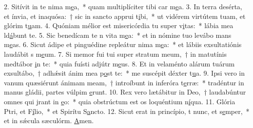 2. Sitívit in te nima m\uline{e}a,~* quam multiplíciter tibi car m\uline{e}a.
3. In terra desérta, et ínvia, et inaquósa:~† sic in sancto apprui t\uline{i}bi,~* ut vidérem virtútem tuam, et glórim t\uline{u}am.
4. Quóniam mélior est misericórdia tu super v\uline{i}tas:~* lábia mea ld\uline{á}bunt te.
5. Sic benedícam te n vita m\uline{e}a:~* et in nómine tuo levábo mans m\uline{e}as.
6. Sicut ádipe et pinguédine repleátur nima m\uline{e}a:~* et lábiis exsultatiónis laudábit s m\uline{e}um.
7. Si memor fui tui super stratum meum,~† in matutínis medtábor \uline{i}n te:~* quia fuísti adjútr m\uline{e}us.
8. Et in velaménto alárum tuárum exsultábo,~† adhǽsit ánim mea p\uline{o}st te:~* me suscépit déxter t\uline{u}a.
9. Ipsi vero in vanum quæsiérunt ánimam meam,~† introíbunt in inferóra t\uline{e}rræ:~* tradéntur in manus gládii, partes vúlpim \uline{e}runt.
10. Rex vero lætábitur in Deo,~† laudabúntur omnes qui jrant in \uline{e}o:~* quia obstrúctum est os loquéntium n\uline{í}qua.
11. Glória Ptri, et F\uline{í}lio,~* et Spirítu S\uline{a}ncto.
12. Sicut erat in princípio, t nunc, et s\uline{e}mper,~* et in sǽcula sæculórm. \uline{A}men.
